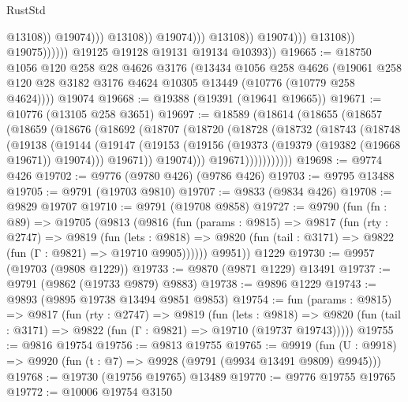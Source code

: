 \begin{lexlean}{RustStd}
\begin{coremodule}
                                                      @13108))
                                                  @19074)))
                                            @13108))
                                        @19074)))
                                  @13108))
                              @19074)))
                        @13108))
                    @19075))))))
        @19125
        @19128
        @19131
        @19134
        @10393))
@19665 := @18750
    @1056
    @120
    @258
    @28
    @4626
    @3176
    (@13434
      @1056
      @258
      @4626
      (@19061 @258 @120 @28 @3182 @3176 @4624 @10305 @13449 (@10776 (@10779 @258 @4624))))
    @19074
@19668 := @19388 (@19391 (@19641 @19665))
@19671 := @10776 (@13105 @258 @3651)
@19697 := @18589
    (@18614
      (@18655
        (@18657
          (@18659
            (@18676
              (@18692
                (@18707
                  (@18720
                    (@18728
                      (@18732
                        (@18743
                          (@18748
                            (@19138
                              (@19144
                                (@19147
                                  (@19153
                                    (@19156 (@19373 (@19379 (@19382 (@19668 @19671)) @19074)))
                                    @19671))
                                @19074)))
                          @19671)))))))))))
@19698 := @9774 @426
@19702 := @9776 (@9780 @426) (@9786 @426)
@19703 := @9795 @13488
@19705 := @9791 (@19703 @9810)
@19707 := @9833 (@9834 @426)
@19708 := @9829 @19707
@19710 := @9791 (@19708 @9858)
@19727 := @9790
    (fun (fn : @89) =>
    @19705
      (@9813
        (@9816
          (fun (params : @9815) =>
          @9817
            (fun (rty : @2747) =>
            @9819
              (fun (lets : @9818) =>
              @9820 (fun (tail : @3171) => @9822 (fun (Γ : @9821) => @19710 @9905))))))
        @9951))
    @1229
@19730 := @9957 (@19703 (@9808 @1229))
@19733 := @9870 (@9871 @1229) @13491
@19737 := @9791 (@9862 (@19733 @9879) @9883)
@19738 := @9896 @1229
@19743 := @9893 (@9895 @19738 @13494 @9851 @9853)
@19754 := fun (params : @9815) =>
  @9817
    (fun (rty : @2747) =>
    @9819
      (fun (lets : @9818) =>
      @9820 (fun (tail : @3171) => @9822 (fun (Γ : @9821) => @19710 (@19737 @19743)))))
@19755 := @9816 @19754
@19756 := @9813 @19755
@19765 := @9919
    (fun (U : @9918) => @9920 (fun (t : @7) => @9928 (@9791 (@9934 @13491 @9809) @9945)))
@19768 := @19730 (@19756 @19765) @13489
@19770 := @9776 @19755 @19765
@19772 := @10006 @19754 @3150

\end{coremodule}
\end{lexlean}
